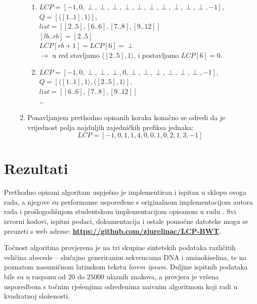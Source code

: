 \documentclass[a4paper,12pt]{article}
\begin{document}
\begin{enumerate}
\begin{enumerate}
\begin{enumerate}
				\item $LCP = [-1,0,\perp,\perp,\perp,\perp,\perp,\perp,\perp,\perp,\perp, \perp, -1]$,\\
			   	$Q = [\langle[1..1],1\rangle]$,\\
			    $list = [[2..5],[6..6],[7..8],[9..12]]$\\

				$[lb .. rb] = [2..5]$\\

				$LCP[rb+1]=LCP[6]=\perp$\\
				$\rightarrow$ u red stavljamo $\langle[2..5],1\rangle$, i postavljamo $LCP[6]=0$.
				\newline
				\item $LCP = [-1,0,\perp,\perp,\perp,0,\perp,\perp,\perp,\perp,\perp, \perp, -1]$,\\
				$Q = [\langle[1..1],1\rangle, \langle[2..5],1\rangle]$,\\
			    $list = [[6..6],[7..8],[9..12]]$\\
				\ldots
			\end{enumerate}

      	\item Ponavljanjem prethodno opisanih koraka konačno se odredi da je vrijednost polja najduljih zajedničkih prefiksa jednaka:
		$$ LCP = [-1,0,1,1,4,0,0,1,0,2,1,3,-1] $$
	\end{enumerate}
\end{enumerate}


\section{Rezultati}

Prethodno opisani algoritam uspješno je implementiran i ispitan u sklopu ovoga rada, a njegove su performanse uspoređene s originalnom implementacijom autora rada \cite{beller2013} i prošlogodišnjom studentskom implementacijom opisanom u radu \cite{studenti2017}. Svi izvorni kodovi, ispitni podaci, dokumentacija i ostale pomoćne datoteke mogu se preuzeti s web adrese: \textbf{\href{https://github.com/zjurelinac/LCP-BWT}{https://github.com/zjurelinac/LCP-BWT}}.

Točnost algoritma provjerena je na tri skupine sintetskih podataka različitih veličina abecede -- slučajno generiranim sekvencama DNA i aminokiselina, te na poznatom nasumičnom latinskom tekstu \textit{lorem ipsum}. Duljine ispitnih podataka bile su u rasponu od $20$ do $25000$ ulaznih znakova, a provjera je vršena usporedbom s točnim rješenjima određenima naivnim algoritmom koji radi u kvadratnoj složenosti.
\end{document}
